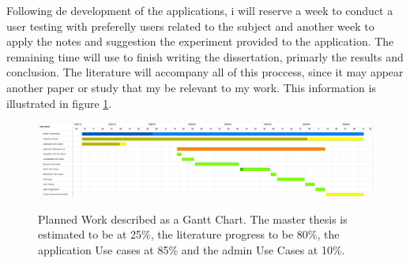   Following de development of the applications, i will reserve a week to conduct a user testing with preferelly users related to the subject and another week to apply the notes and suggestion the experiment provided to the application.
  The remaining time will use to finish writing the dissertation, primarly the results and conclusion.
  The literature will accompany all of this proccess, since it may appear another paper or study that my be relevant to my work.
  This information is illustrated in figure \ref{fig:figure1}.

    \begin{figure}[h]
      \caption{Planned Work described as a Gantt Chart. The master thesis is estimated to be at 25\%, the literature progress to be 80\%, the application Use cases at 85\% and the admin Use Cases at 10\%.}
      \centering
      \includegraphics[width=\textwidth]{figs/Gantt}
      \label{fig:figure1}
    \end{figure}

